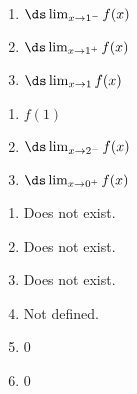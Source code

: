 {
\noindent\begin{minipage}{\linewidth}\centering
{}
\end{minipage}

\noindent\begin{minipage}[t]{.49\linewidth}
\begin{enumerate}
\item		$\ds \lim_{x\to 1^-} f(x)$
\item		$\ds \lim_{x\to 1^+} f(x)$
\item		$\ds \lim_{x\to 1} f(x)$
\end{enumerate}
\end{minipage}
\noindent\begin{minipage}[t]{.49\linewidth}
\begin{enumerate}\addtocounter{enumii}{3}
\item		$f(1)$
\item		$\ds \lim_{x\to 2^-} f(x)$
\item		$\ds \lim_{x\to 0^+} f(x)$
\end{enumerate}
\end{minipage}
}
{\begin{enumerate}
\item		Does not exist.
\item		Does not exist.
\item		Does not exist.
\item		Not defined.
\item		0
\item	 	0
\end{enumerate}
}



